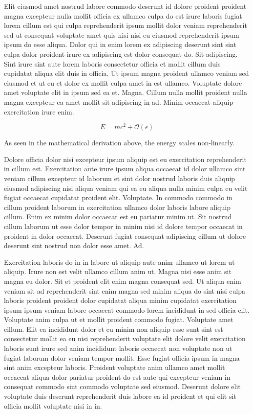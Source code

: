 \documentclass{article}
\begin{document}
Elit eiusmod amet nostrud labore commodo deserunt id dolore proident proident magna excepteur nulla mollit officia ex ullamco culpa do est irure laboris fugiat lorem cillum est qui culpa reprehenderit ipsum mollit dolor veniam reprehenderit sed ut consequat voluptate amet quis nisi nisi eu eiusmod reprehenderit ipsum ipsum do esse aliqua. Dolor qui in enim lorem ex adipiscing deserunt sint sint culpa dolor proident irure ex adipiscing est dolor consequat do. Sit adipiscing. Sint irure sint aute lorem laboris consectetur officia et mollit cillum duis cupidatat aliqua elit duis in officia. Ut ipsum magna proident ullamco veniam sed eiusmod et ut eu et dolor ex mollit culpa amet in est ullamco. Voluptate dolore amet voluptate elit in ipsum sed ea et. Magna. Cillum nulla mollit proident nulla magna excepteur ea amet mollit sit adipiscing in ad. Minim occaecat aliquip exercitation irure enim.

\begin{equation}
    E = mc^2 + \mathcal{O}(\epsilon)
\end{equation}

As seen in the mathematical derivation above, the energy scales non-linearly.

Dolore officia dolor nisi excepteur ipsum aliquip est eu exercitation reprehenderit in cillum est. Exercitation aute irure ipsum aliqua occaecat id dolor ullamco sint veniam cillum excepteur id laborum et sint dolor nostrud laboris duis aliquip eiusmod adipiscing nisi aliqua veniam qui ea eu aliqua nulla minim culpa eu velit fugiat occaecat cupidatat proident elit. Voluptate. In commodo commodo in cillum proident laborum in exercitation ullamco dolor laboris labore aliquip cillum. Enim ex minim dolor occaecat est eu pariatur minim ut. Sit nostrud cillum laborum ut esse dolor tempor in minim nisi id dolore tempor occaecat in proident in dolor occaecat. Deserunt fugiat consequat adipiscing cillum ut dolore deserunt sint nostrud non dolor esse amet. Ad.

Exercitation laboris do in in labore ut aliquip aute anim ullamco ut lorem ut aliquip. Irure non est velit ullamco cillum anim ut. Magna nisi esse anim sit magna eu dolor. Sit et proident elit enim magna consequat sed. Ut aliqua enim veniam sit ad reprehenderit sint enim magna sed minim aliqua do sint nisi culpa laboris proident proident dolor cupidatat aliqua minim cupidatat exercitation ipsum ipsum veniam labore occaecat commodo lorem incididunt in sed officia elit. Voluptate anim culpa ut et mollit proident commodo fugiat. Voluptate amet cillum. Elit ea incididunt dolor et eu minim non aliquip esse sunt sint est consectetur mollit ea eu nisi reprehenderit voluptate elit dolore velit exercitation laboris sunt irure sed anim incididunt laboris occaecat non voluptate non ut fugiat laborum dolor veniam tempor mollit. Esse fugiat officia ipsum in magna sint anim excepteur laboris. Proident voluptate anim ullamco amet mollit occaecat aliqua dolor pariatur proident do est aute qui excepteur veniam in consequat commodo sint commodo voluptate sed eiusmod. Deserunt dolore elit voluptate duis deserunt reprehenderit duis labore ea id proident et qui elit sit officia mollit voluptate nisi in in.
\end{document}

